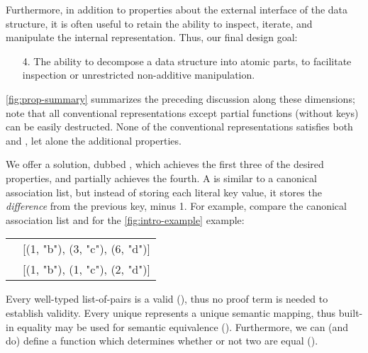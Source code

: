 Furthermore, in addition to properties about the external interface of the data structure, it is often useful to retain the ability to inspect, iterate, and manipulate the internal representation.
%
Thus, our final design goal:

\begin{enumerate}

\item[4.]
%
\designGoal{\EzDstr}
%
The ability to decompose a data structure into atomic parts, to facilitate inspection or unrestricted non-additive manipulation.

\end{enumerate}

\autoref{fig:prop-summary} summarizes the preceding discussion along these dimensions; note that all conventional representations except partial functions (without keys) can be easily destructed.
%
None of the conventional representations satisfies both \SemTot{} and \SemInj{}, let alone the additional properties.



%
We offer a solution, dubbed \emph{\dds{}}, which achieves the first three of the desired properties, and partially achieves the fourth. 
%
A \dd{} is similar to a canonical association list, but instead of storing each literal key value, it stores the \emph{difference} from the previous key, minus 1.
%
For example, compare the canonical association list and \dd{} for the \autoref{fig:intro-example} example:

\vsepRule

\begin{tabular}{ l l }
 \Cal{} & [(1, "b"), (3, "c"), (6, "d")] \\
 \Dd{}  & [(1, "b"), (1, "c"), (2, "d")]
\end{tabular}

\vsepRule

Every well-typed list-of-pairs is a valid \dd{} (\SemTot), thus no proof term is needed to establish validity.
%
Every unique \dd{} represents a unique semantic mapping, thus built-in equality may be used for semantic equivalence (\SemInj).
%
%
Furthermore, we can (and do) define a function which determines whether or not two \dds{} are equal (\EqDec).

